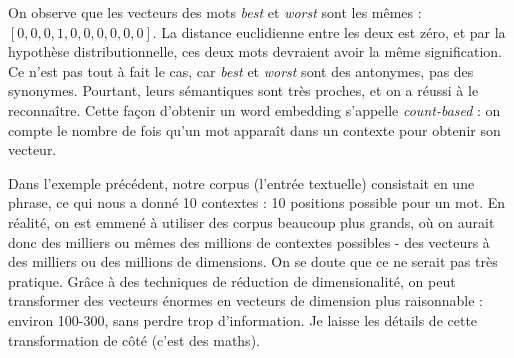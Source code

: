 \documentclass[11pt, a4paper]{report}
\begin{document}
\begin{table}[h]
    \caption{Contextes d'une phrase.} 
    \label{tab:sémantique-distr-exemple} 
\end{table}

On observe que les vecteurs des mots \textit{best} et \textit{worst} sont les mêmes :
$[0,0,0,1,0,0,0,0,0,0]$. La distance euclidienne entre les deux est zéro, et par la 
hypothèse distributionnelle, ces deux mots devraient avoir la même signification. Ce n'est pas 
tout à fait le cas, car \textit{best} et \textit{worst} sont des antonymes, pas des synonymes. 
Pourtant, leurs sémantiques sont très proches, et on a réussi à le reconnaître.
Cette façon d'obtenir un word embedding s'appelle \textit{count-based} : on compte le nombre de fois 
qu'un mot apparaît dans un contexte pour obtenir son vecteur.  

Dans l'exemple précédent, notre corpus (l'entrée textuelle) consistait en une phrase, ce qui 
nous a donné 10 contextes : 10 positions possible pour un mot.  
En réalité, on est emmené à utiliser des corpus beaucoup plus grands, où on aurait donc des 
milliers ou mêmes des millions de contextes possibles - des vecteurs à des milliers ou des 
millions de dimensions. On se doute que ce ne serait pas très 
pratique. Grâce à des techniques de réduction de dimensionalité, on peut transformer des vecteurs 
énormes en vecteurs de dimension plus raisonnable : environ 100-300, sans perdre trop 
d'information. Je laisse les détails de cette 
transformation de côté (c'est des maths).
\end{document}
